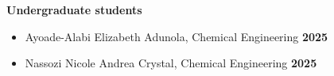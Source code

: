 \documentclass[margin,line]{res}
\begin{document}
\begin{resume}

%

{\bf Undergraduate students}
\begin{itemize}
\item[] Ayoade-Alabi Elizabeth Adunola, Chemical Engineering
\hfill {\bf 2025}
\item[] Nassozi Nicole Andrea Crystal, Chemical Engineering
\hfill {\bf 2025}
\end{itemize}


\end{resume}
\end{document}
